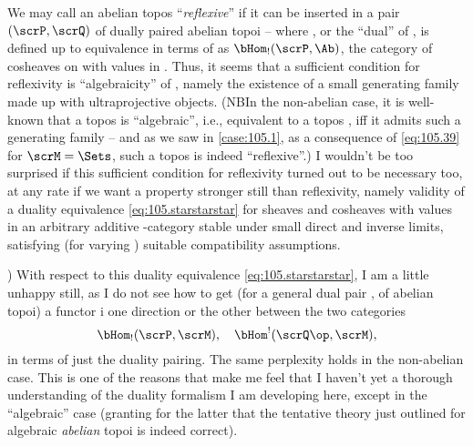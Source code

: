 We may call an abelian topos ``\emph{reflexive}'' if it can be
inserted in a pair $(\scrP,\scrQ)$ of dually paired abelian topoi --
where \scrQ, or the ``dual'' of \scrP, is defined up to equivalence in
terms of \scrP{} as $\bHom_!(\scrP,\Ab)$, the category of cosheaves on
\scrP{} with values in \Ab. Thus, it seems that a sufficient condition
for reflexivity is ``algebraicity'' of \scrP, namely the existence of
a small generating family made up with ultraprojective
objects. (NB\enspace In the non-abelian case, it is well-known that a
topos \scrA{} is ``algebraic'', i.e., equivalent to a topos \Ahat,
if{f} it admits such a generating family -- and as we saw in
\ref{case:105.1}, as a consequence of \eqref{eq:105.39} for
$\scrM=\Sets$, such a topos is indeed ``reflexive''.) I wouldn't be
too surprised if this sufficient condition for reflexivity turned out
to be necessary too, at any rate if we want a property stronger still
than reflexivity, namely validity of a duality equivalence
\eqref{eq:105.starstarstar} for sheaves and cosheaves with values in
an arbitrary additive \scrU-category stable under small direct and
inverse limits, satisfying (for varying \scrM) suitable compatibility
assumptions.

)%
\enspace With respect to this duality equivalence
\eqref{eq:105.starstarstar}, I am a little unhappy still, as I do not
see how to get (for a general dual pair \scrP, \scrQ{} of abelian
topoi) a functor i one direction or the other between the two
categories
\[\bHom_!(\scrP,\scrM),\quad\bHom^!(\scrQ\op,\scrM),\]
in terms of just the duality pairing. The same perplexity holds in the
non-abelian case. This is one of the reasons that make me feel that I
haven't yet a thorough understanding of the duality formalism I am
developing here, except in the ``algebraic'' case (granting for the
latter that the tentative theory just outlined for algebraic
\emph{abelian} topoi is indeed correct).

